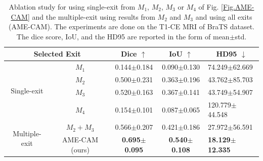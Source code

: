 \begin{table}[h]
\centering
\caption{Ablation study for using single-exit from $M_1$, $M_2$, $M_3$ or $M_4$ of Fig. \ref{Fig.AME-CAM} and the multiple-exit using results from $M_2$ and $M_3$ and using all exits (AME-CAM). The experiments are done on the T1-CE MRI of BraTS dataset. The dice score, IoU, and the HD95 are reported in the form of mean$\pm$std.}
\label{Table:ablation_single_exit}
\begin{tabular}{c|c|c|c|l}
\hline
\multicolumn{2}{c|}{Selected Exit}                & Dice $\uparrow$        & IoU $\uparrow$         & \multicolumn{1}{c}{HD95 $\downarrow$}           \\ \hline
\multirow{4}{*}{Single-exit}   & $M_1$          & 0.144$\pm$0.184 & 0.090$\pm$0.130 & 74.249$\pm$62.669           \\
              & $M_2$          & 0.500$\pm$0.231 & 0.363$\pm$0.196 & 43.762$\pm$85.703           \\
              & $M_3$          & 0.520$\pm$0.163 & 0.367$\pm$0.141 & 43.749$\pm$54.907           \\
              & $M_4$          & 0.154$\pm$0.101 & 0.087$\pm$0.065 & 120.779$\pm$44.548          \\ \hline
\multirow{2}{*}{Multiple-exit} & $M_2+M_3$      & 0.566$\pm$0.207 & 0.421$\pm$0.186 & 27.972$\pm$56.591           \\
              & AME-CAM (ours) & \textbf{0.695$\pm$0.095} & \textbf{0.540$\pm$0.108} & \textbf{18.129$\pm$12.335}           \\ \hline
\end{tabular}
\end{table}